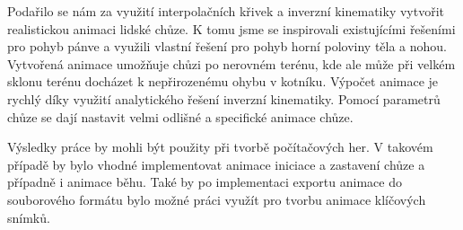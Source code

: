 Podařilo se nám za využití interpolačních křivek a inverzní kinematiky vytvořit realistickou animaci lidské chůze. K tomu jsme se inspirovali existujícími řešeními pro pohyb pánve a využili vlastní řešení pro pohyb horní poloviny těla a nohou. Vytvořená animace umožňuje chůzi po nerovném terénu, kde ale může při velkém sklonu terénu docházet k nepřirozenému ohybu v kotníku. Výpočet animace je rychlý díky využití analytického řešení inverzní kinematiky. Pomocí parametrů chůze se dají nastavit velmi odlišné a specifické animace chůze.

Výsledky práce by mohli být použity při tvorbě počítačových her. V takovém případě by bylo vhodné implementovat animace iniciace a zastavení chůze a případně i animace běhu. Také by po implementaci exportu animace do souborového formátu bylo možné práci využít pro tvorbu animace klíčových snímků.


